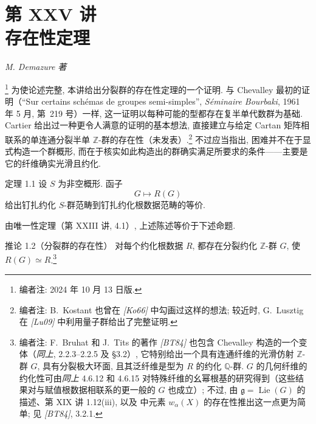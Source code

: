 \chapter*{第 XXV 讲\\存在性定理}
\begin{center}
\textit{M. Demazure 著}
\end{center}

\footnote{编者注: 2024 年 10 月 13 日版.}
为使论述完整, 本讲给出分裂群的存在性定理的一个证明. 与 Chevalley 最初的证明（“Sur certains schémas de groupes semi-simples”, \textit{Séminaire Bourbaki}, 1961 年 5 月, 第~219 号）一样, 这一证明以每种可能的型都存在复半单代数群为基础. Cartier 给出过一种更令人满意的证明的基本想法, 直接建立与给定 Cartan 矩阵相联系的单连通分裂半单 \(\mathbb Z\)-群的存在性（未发表）.\footnote{编者注: B.~Kostant 也曾在 \emph{[Ko66]} 中勾画过这样的想法; 较近时, G.~Lusztig 在 \emph{[Lu09]} 中利用量子群给出了完整证明.}
不过应当指出, 困难并不在于显式构造一个群概形, 而在于核实如此构造出的群确实满足所要求的条件——主要是它的纤维确实光滑且约化.


\begin{sgastatement}{定理 1.1}
设 \(S\) 为非空概形. 函子
\[
  G\longmapsto R(G)
\]
给出钉扎约化 \(S\)-群范畴到钉扎约化根数据范畴的等价.
\end{sgastatement}

由唯一性定理（第 XXIII 讲, 4.1）, 上述陈述等价于下述命题.

\begin{sgastatement}{推论 1.2（分裂群的存在性）}
对每个约化根数据 \(R\), 都存在分裂约化 \(\mathbb Z\)-群 \(G\), 使 \(R(G)\simeq R\).\footnote{编者注: F.~Bruhat 和 J.~Tits 的著作 \emph{[BT84]} 也包含 Chevalley 构造的一个变体（\emph{同上}, 2.2.3--2.2.5 及 \S3.2）, 它特别给出一个具有连通纤维的光滑仿射 \(\mathbb Z\)-群 \(G\), 具有分裂极大环面, 且其泛纤维是型为 \(R\) 的约化 \(\mathbb Q\)-群. \(G\) 的几何纤维的约化性可由\emph{同上} 4.6.12 和 4.6.15 对特殊纤维的幺幂根基的研究得到（这些结果对与赋值根数据相联系的更一般的 \(G\) 也成立）; 不过, 由 \(\mathfrak g=\operatorname{Lie}(G)\) 的描述、第 XIX 讲 1.12(iii), 以及 中元素 \(w_\alpha(X)\) 的存在性推出这一点更为简单; 见 \emph{[BT84]}, 3.2.1.}
\end{sgastatement}

